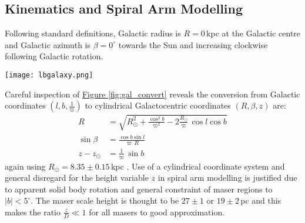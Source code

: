 		\subsection{Kinematics and Spiral Arm Modelling}
	        Following standard definitions, Galactic radius is $R=0$\,kpc at the Galactic centre and Galactic azimuth is $\beta=0^\circ$ towards the Sun and increasing clockwise following Galactic rotation. 
            \begin{SCfigure}[][h]
	            \centering
             	\texttt{[image: lbgalaxy.png]}
             	\caption[Galactic and Galactocentric Coordinates]{Schematic of the relationship between Galactic $(l,b,\frac{1}{\varpi})$ and Galactocentric $(R,\beta,z)$ coordinate systems.}\label{fig:gal_convert}
            \end{SCfigure}
            Careful inspection of \hyperref[fig:gal_convert]{Figure \ref*{fig:gal_convert}} reveals the conversion from Galactic coordinates $(l,b,\frac{1}{\varpi})$ to cylindrical Galactocentric coordinates $(R,\beta,z)$ are:
	        \begin{align*}
			    R &= \sqrt{R_\odot^2+\frac{\cos^2 b}{\varpi^2}-2\frac{R_\odot}{\varpi}\,\cos l\cos b}\\
	            \sin\beta &= \frac{\cos b\sin l}{\varpi\,R}\\
	            z - z_\odot&= \frac{1}{\varpi}\,\sin b
	        \end{align*} again using $R_\odot=8.35\pm0.15$\,kpc \citep{Reid2014}. Use of a cylindrical coordinate system and general disregard for the height variable $z$ in spiral arm modelling is justified due to apparent solid body rotation and general constraint of maser regions to $|b|<5^\circ$. The maser scale height is thought to be $27\pm1$ \citep{Green2011b} or $19\pm2$\,pc \citep{Reid2019} and this makes the ratio $\frac{z}{D}\ll1$ for all masers to good approximation.
	        

